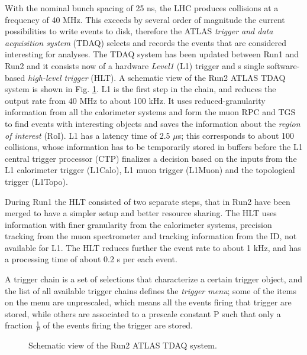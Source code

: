 With the nominal bunch spacing of 25 ns, the LHC produces collisions at a frequency of 40 MHz. This exceeds by several order of magnitude the current possibilities to write events to disk, therefore the ATLAS \textit{trigger and data acquisition system} (TDAQ) selects and records the events that are considered interesting for analyses. The TDAQ system has been updated between Run1 and Run2 \cite{Aaboud:2016leb} and it consists now of a  hardware \textit{Level1} (L1) trigger and s single software-based \textit{high-level trigger} (HLT). A schematic view of the Run2 ATLAS TDAQ system is shown in Fig. \ref{fig:atlas:trig}. L1 is the first step in the chain, and reduces the output rate from 40 MHz to about 100 kHz. It uses reduced-granularity information from all the calorimeter systems and form the muon RPC and TGS to find events with interesting objects and saves the information about the \textit{region of interest} (RoI). L1 has a latency time of 2.5 $\mu$s; this corresponds to about 100 collisions, whose information has to be temporarily stored in buffers before the L1 central trigger processor (CTP) finalizes a decision based on the inputs from the L1 calorimeter trigger (L1Calo), L1 muon trigger (L1Muon) and the topological trigger (L1Topo). 

During Run1 the HLT consisted of two separate steps, that in Run2 have been merged to have a simpler setup and better resource sharing. The HLT uses information with finer granularity from the calorimeter systems, precision tracking from the muon spectrometer and tracking information from the ID, not available for L1. The HLT reduces further the event rate to about 1 kHz, and has a processing time of about 0.2 s per each event. 

A trigger chain is a set of selections that characterize a certain trigger object, and the list of all available trigger chains defines the \textit{trigger menu}; some of the items on the menu are unprescaled, which means all the events firing that trigger are stored, while others are associated to a prescale constant P such that only a fraction $\frac{1}{P}$ of the events firing the trigger are stored.

\begin{figure}[ht]
\centering
{}
\caption{Schematic view of the Run2 ATLAS TDAQ system.}
\label{fig:atlas:trig}
\end{figure}


